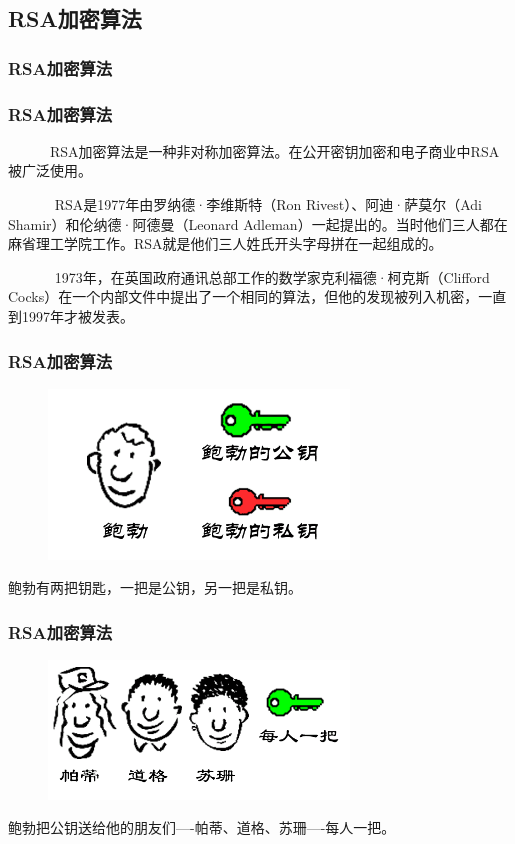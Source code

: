 \documentclass[slidestop,compress,mathserif]{beamer}
\begin{document}
\subsection{\hfill RSA加密算法}
\begin{frame}
  \frametitle{RSA加密算法}
\end{frame}
\begin{frame}
  \transsplitverticalin
  \frametitle{RSA加密算法}
 ~ ~ ~ ~RSA加密算法是一种非对称加密算法。在公开密钥加密和电子商业中RSA被广泛使用。

~ ~ ~ ~ RSA是1977年由罗纳德·李维斯特（Ron Rivest）、阿迪·萨莫尔（Adi Shamir）和伦纳德·阿德曼（Leonard Adleman）一起提出的。当时他们三人都在麻省理工学院工作。RSA就是他们三人姓氏开头字母拼在一起组成的。

~ ~ ~ ~ 1973年，在英国政府通讯总部工作的数学家克利福德·柯克斯（Clifford Cocks）在一个内部文件中提出了一个相同的算法，但他的发现被列入机密，一直到1997年才被发表。

\end{frame}


\begin{frame}
  \transboxout
  \frametitle{RSA加密算法}
  \begin{center}
    \begin{figure}
      \includegraphics[width=8cm]{bg1}
    \end{figure}
    鲍勃有两把钥匙，一把是公钥，另一把是私钥。
  \end{center}
\end{frame}

\begin{frame}
  \transboxout
  \frametitle{RSA加密算法}
  \begin{center}
    \begin{figure}
      \includegraphics[width=8cm]{bg2}
    \end{figure}
  \end{center}
  鲍勃把公钥送给他的朋友们----帕蒂、道格、苏珊----每人一把。
\end{frame}
\end{document}
